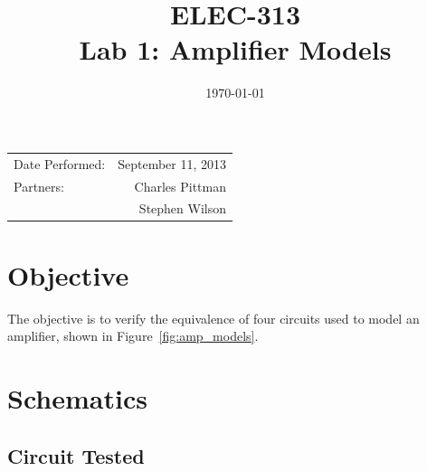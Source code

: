 \documentclass{article}
\author{}
\title{ELEC-313 \\ Lab 1: Amplifier Models \\ }
\date{\today}
\begin{document}
\maketitle %

 \begin{center}
   \begin{tabular}{lr}
     Date Performed: & September 11, 2013 \\
     Partners: & Charles Pittman \\
               & Stephen Wilson \\
  \end{tabular}
\end{center}

\pagebreak


\renewcommand{\labelenumi}{\alph{enumi}.}

\section{Objective}
\label{sec:objective}

The objective is to verify the equivalence of four circuits used to
model an amplifier, shown in Figure~\ref{fig:amp_models}.

\section{Schematics}
\label{sec:schematics}

\subsection*{Circuit Tested}
\label{sec:ckt_tested}
\end{document}

